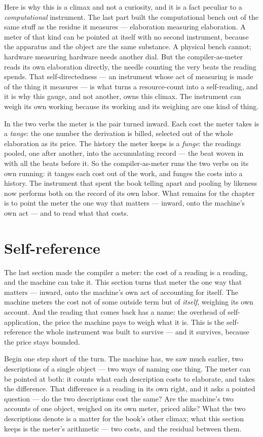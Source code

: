 Here is why this is a climax and not a curiosity, and it is a fact peculiar to a \emph{computational} instrument. The
last part built the computational bench out of the same stuff as the residue it measures --- elaboration measuring
elaboration. A meter of that kind can be pointed at itself with no second instrument, because the apparatus and the
object are the same substance. A physical bench cannot; hardware measuring hardware needs another dial. But the
compiler-as-meter reads its own elaboration directly, the needle counting the very beats the reading spends. That
self-directedness --- an instrument whose act of measuring is made of the thing it measures --- is what turns a
resource-count into a self-reading, and it is why this gauge, and not another, owns this climax. The instrument can weigh
its own working because its working and its weighing are one kind of thing.

In the two verbs the meter is the pair turned inward. Each cost the meter takes is a \emph{tange}: the one number the
derivation is billed, selected out of the whole elaboration as its price. The history the meter keeps is a \emph{funge}:
the readings pooled, one after another, into the accumulating record --- the beat woven in with all the beats before it.
So the compiler-as-meter runs the two verbs on its own running: it tanges each cost out of the work, and funges the costs
into a history. The instrument that spent the book telling apart and pooling by likeness now performs both on the record
of its own labor. What remains for the chapter is to point the meter the one way that matters --- inward, onto the
machine's own act --- and to read what that costs.

\section{Self-reference}

The last section made the compiler a meter: the cost of a reading is a reading, and the machine can take it. This section
turns that meter the one way that matters --- inward, onto the machine's own act of accounting for itself. The machine
meters the cost not of some outside term but of \emph{itself}, weighing its own account. And the reading that comes back
has a name: the overhead of self-application, the price the machine pays to weigh what it is. This is the self-reference
the whole instrument was built to survive --- and it survives, because the price stays bounded.

Begin one step short of the turn. The machine has, we saw much earlier, two descriptions of a single object --- two ways
of naming one thing. The meter can be pointed at both: it counts what each description costs to elaborate, and takes the
difference. That difference is a reading in its own right, and it asks a pointed question --- do the two descriptions cost
the same? Are the machine's two accounts of one object, weighed on its own meter, priced alike? What the two descriptions
denote is a matter for the book's other climax; what this section keeps is the meter's arithmetic --- two costs, and the
residual between them.

